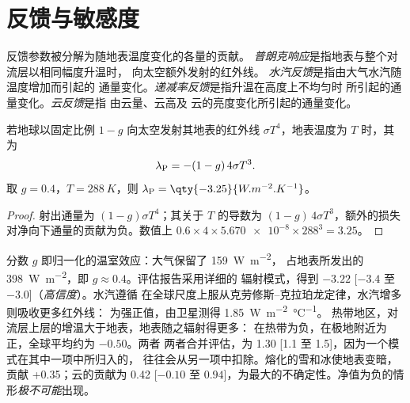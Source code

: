 \section{反馈与敏感度}\label{sec:b2:anthropogenic-climate-change:feedbacks}

\begin{definition}\label{def:b2:anthropogenic-climate-change:feedbacks}
反馈参数被分解为随地表温度变化的各量的贡献。
\emph{普朗克响应}是指地表与整个对流层以相同幅度升温时，
向太空额外发射的红外线。
\emph{水汽反馈}是指由大气水汽随温度增加而引起的
通量变化。\emph{递减率反馈}是指升温在高度上不均匀时
所引起的通量变化。\emph{云反馈}是指
由云量、云高及
云的亮度变化所引起的通量变化。
\end{definition}

\begin{proposition}[普朗克响应]\label{prop:b2:anthropogenic-climate-change:planck}
若地球以固定比例 $1 - g$ 向太空发射其地表的红外线 $\sigma T^4$，地表温度为
$T$ 时，其为
\[
  \lambda_{\text P} = -(1 - g)\,4\sigma T^3 .
\]
取 $g = 0.4$，$T = \qty{288}{K}$，则 $\lambda_{\text P} = \qty{-3.25}{W.m^{-2}.K^{-1}}$。
\end{proposition}
\begin{proof}
射出通量为 $(1 - g)\sigma T^4$；其关于 $T$ 的导数为 $(1 - g)\,4\sigma
T^3$，额外的损失对净向下通量的贡献为负。数值上 $0.6
\times 4 \times \num{5.670e-8} \times 288^3 = 3.25$。
\end{proof}

分数 $g$ 即归一化的温室效应：大气保留了 \qty{159}{W.m^{-2}}，
占地表所发出的 \qty{398}{W.m^{-2}}，即 $g \approx 0.4$。评估报告采用详细的
辐射模式，得到 $-3.22$ [$-3.4$ 至 $-3.0$]（\emph{高信度}）。水汽遵循
在全球尺度上服从克劳修斯–克拉珀龙定律，水汽增多则吸收更多红外线：
为强正值，由卫星测得 \qty{1.85}{W.m^{-2}.\celsius^{-1}}。
热带地区，对流层上层的增温大于地表，地表随之辐射得更多：
在热带为负，在极地附近为正，全球平均约为 $-0.50$。两者
两者合并评估，为 \num{1.30} [1.1 至 1.5]，因为一个模式在其中一项中所归入的，
往往会从另一项中扣除。熔化的雪和冰使地表变暗，贡献 +0.35；云的贡献为 \num{0.42}
[$-0.10$ 至 $0.94$]，为最大的不确定性。净值为负的情形\emph{极不可能}出现。

